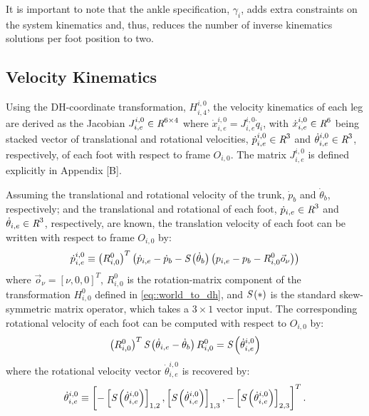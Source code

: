 			It is important to note that the ankle specification,  $\gamma_{i}$, adds extra constraints on the system kinematics and, thus, reduces the number of inverse kinematics solutions per foot position to two.




		\subsection{Velocity Kinematics}

			Using the DH-coordinate transformation, ${H}^{i,0}_{i,4}$, the velocity kinematics of each \Ith leg are derived as the Jacobian $J^{i,0}_{i,e} \in\emph{R}^{6\times4}$ where $ \dot{x}^{i,0}_{i,e} = J^{i,0}_{i,e}  \dot{q}_{i}$, with $\dot{x}^{i,0}_{i,e} \in\emph{R}^{6}$ being stacked vector of translational and rotational velocities, $\dot{p}_{i,e}^{i,0} \in\emph{R}^{3}$ and $\dot{\theta}_{i,e}^{i,0}\in\emph{R}^{3}$, respectively, of each \Ith foot with respect to frame $O_{i,0}$. The matrix $J^{i,0}_{i,e}$ is defined explicitly in Appendix [B].

			Assuming the translational and rotational velocity of the trunk, $\dot{p}_{b}$ and $\dot{\theta}_{b}$, respectively; and the translational and rotational of each \Ith foot, $\dot{p}_{i,e} \in\emph{R}^{3}$ and $\dot{\theta}_{i,e} \in\emph{R}^{3}$, respectively, are known, the translation velocity of each \Ith foot can be written with respect to frame $O_{i,0}$ by:
				\begin{equation}
					\dot{p}_{i,e}^{i,0} \equiv \left(R^{0}_{i,0}\right)^{T} \left( \dot{p}_{i,e} - \dot{p}_{b} - \emph{S}\left( \dot{\theta}_{b} \right) \left( {p}_{i,e} - {p}_{b} - R^{0}_{i,0} \vec{o}_{\nu} \right) \right)
				\end{equation}
			where $\vec{o}_{\nu} = [\nu,0,0]^{T}$, $R^{0}_{i,0}$ is the rotation-matrix component of the transformation $H^{0}_{i,0}$ defined in \ref{eq::world_to_dh}, and $\emph{S}\left(*\right)$ is the standard skew-symmetric matrix operator, which takes a $3\times1$ vector input. The corresponding rotational velocity of each \Ith foot  can be computed with respect to $O_{i,0}$ by:
				\begin{equation}
					\left( R^{0}_{i,0} \right)^{T} \emph{S}\left( \dot{\theta}_{i,e} - \dot{\theta}_{b} \right) R^{0}_{i,0}  = \emph{S}\left( \dot{\theta}^{i,0}_{i,e} \right)
				\end{equation}
			where the rotational velocity vector $\dot{\theta}^{i,0}_{i,e}$ is recovered by:
				\begin{equation}
					\dot{\theta}^{i,0}_{i,e} \equiv \left[ 
						-\left[\emph{S}\left( \dot{\theta}^{i,0}_{i,e} \right)\right]_{1,2},
						 \left[\emph{S}\left( \dot{\theta}^{i,0}_{i,e} \right)\right]_{1,3},
						-\left[\emph{S}\left( \dot{\theta}^{i,0}_{i,e} \right)\right]_{2,3}
					\right]^{T}.
				\end{equation}

